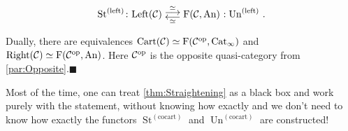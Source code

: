 \begin{thm}
\begin{alphanumerate}
		\begin{equation*}
			\operatorname{St}^{(\mathrm{left})}\colon \cat{Left}(\Cc) \underset{\simeq}{\mathrel{\smash{\underset{\smash{\raisebox{0.35em}{$\longleftarrow$}}}{\overset{\smash{\raisebox{-0.35em}{$\overset{\simeq}{\longrightarrow}$}}}{\phantom{\longrightarrow}}}}}}\F(\Cc,\cat{An})\noloc \operatorname{Un}^{(\mathrm{left})}\vphantom{\overset{\simeq}{\overline{x}}}\,.
		\end{equation*}
	\end{alphanumerate}
	Dually, there are equivalences $\mathrm{Cart}(\mathcal{C})\simeq \operatorname{F}(\mathcal{C}^{\mathrm{op}},\mathrm{Cat}_\infty)$ and $\mathrm{Right}(\mathcal{C})\simeq \operatorname{F}(\mathcal{C}^{\mathrm{op}},\mathrm{An})$. Here $\mathcal{C}^{\mathrm{op}}$ is the opposite quasi-category from \cref{par:Opposite}.\hfill$\blacksquare$
\end{thm}
Most of the time, one can treat \cref{thm:Straightening} as a black box and work purely with the statement, without knowing how exactly and we don't need to know how exactly the functors $\operatorname{St}^{(\mathrm{cocart})}$ and $\operatorname{Un}^{(\mathrm{cocart})}$ are constructed! 

